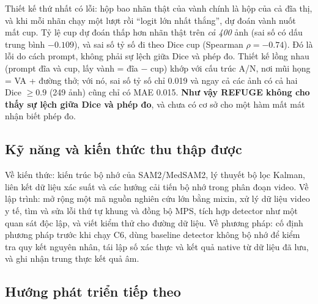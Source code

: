 \documentclass[a4paper,12pt]{report}
\begin{document}
\begin{table}[htbp]
\centering
\caption{Hai vùng trên REFUGE val (400 ảnh).}
\end{table}

Thiết kế thứ nhất có lỗi: hộp bao nhãn thật của vành chính là hộp của cả đĩa thị, và khi mỗi nhãn chạy một lượt rồi ``logit lớn nhất thắng'', dự đoán vành nuốt mất cup. Tỷ lệ cup dự đoán thấp hơn nhãn thật trên \emph{cả 400} ảnh (sai số có dấu trung bình $-0.109$), và sai số tỷ số đi theo Dice cup (Spearman $\rho=-0.74$). Đó là lỗi do cách prompt, không phải sự lệch giữa Dice và phép đo. Thiết kế lồng nhau (prompt đĩa và cup, lấy vành = đĩa $-$ cup) khớp với cấu trúc A/N, nơi mũi họng = VA + đường thở; với nó, sai số tỷ số chỉ 0.019 và ngay cả các ảnh có cả hai Dice $\geq 0.9$ (249 ảnh) cũng chỉ có MAE 0.015. \textbf{Như vậy REFUGE không cho thấy sự lệch giữa Dice và phép đo}, và chưa có cơ sở cho một hàm mất mát nhận biết phép đo.

\subsection{Kỹ năng và kiến thức thu thập được}

Về kiến thức: kiến trúc bộ nhớ của SAM2/MedSAM2, lý thuyết bộ lọc Kalman, liên kết dữ liệu xác suất và các hướng cải tiến bộ nhớ trong phân đoạn video. Về lập trình: mở rộng một mã nguồn nghiên cứu lớn bằng mixin, xử lý dữ liệu video y tế, tìm và sửa lỗi thứ tự khung và đồng bộ MPS, tích hợp detector như một quan sát độc lập, và viết kiểm thử cho đường dữ liệu. Về phương pháp: cố định phương pháp trước khi chạy C6, dùng baseline detector không bộ nhớ để kiểm tra quy kết nguyên nhân, tái lập số xác thực và kết quả native từ dữ liệu đã lưu, và ghi nhận trung thực kết quả âm.

\subsection{Hướng phát triển tiếp theo}
\end{document}
